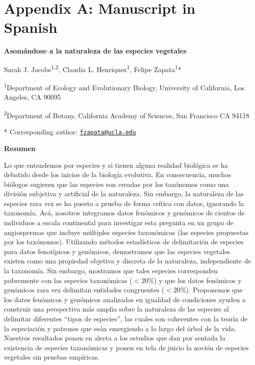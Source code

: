 \documentclass[
  11pt,
]{article}
\begin{document}
\pagebreak

\hypertarget{appendix-appendix}{%
\appendix}


\hypertarget{appendix-a-manuscript-in-spanish}{%
\section{Appendix A: Manuscript in Spanish}\label{appendix-a-manuscript-in-spanish}}

\textbf{Asomándose a la naturaleza de las especies vegetales}

Sarah J. Jacobs\textsuperscript{1,2}, Claudia L. Henriquez\textsuperscript{1}, Felipe Zapata\textsuperscript{1}*

\textsuperscript{1}Department of Ecology and Evolutionary Biology, University of California, Los Angeles, CA 90095

\textsuperscript{2}Department of Botany, California Academy of Sciences, San Francisco CA 94118

* Corresponding author: \href{mailto:fzapata@ucla.edu}{\nolinkurl{fzapata@ucla.edu}}

\textbf{Resumen}

Lo que entendemos por especies y si tienen alguna realidad biológica se ha debatido desde los inicios de la biología evolutiva. En consecuencia, muchos biólogos sugieren que las especies son creadas por los taxónomos como una división subjetiva y artificial de la naturaleza. Sin embargo, la naturaleza de las especies rara vez se ha puesto a prueba de forma crítica con datos, ignorando la taxonomía. Acá, nosotros integramos datos fenómicos y genómicos de cientos de individuos a escala continental para investigar esta pregunta en un grupo de angiospermas que incluye múltiples especies taxonómicas (las especies propuestas por los taxónomos). Utilizando métodos estadísticos de delimitación de especies para datos fenotípicos y genómicos, demostramos que las especies vegetales existen como una propiedad objetiva y discreta de la naturaleza, independiente de la taxonomía. Sin embargo, mostramos que tales especies corresponden pobremente con las especies taxonómicas (\(<20\%\)) y que los datos fenómicos y genómicos rara vez delimitan entidades congruentes (\(<20\%\)). Proponemos que los datos fenómicos y genómicos analizados en igualdad de condiciones ayuden a construir una perspectiva más amplia sobre la naturaleza de las especies al delimitar diferentes ``tipos de especies'', las cuales son coherentes con la teoría de la especiación y patrones que esán emergiendo a lo largo del árbol de la vida. Nuestros resultados ponen en alerta a los estudios que dan por sentada la existencia de especies taxonómicas y ponen en tela de juicio la noción de especies vegetales sin pruebas empíricas.
\end{document}
